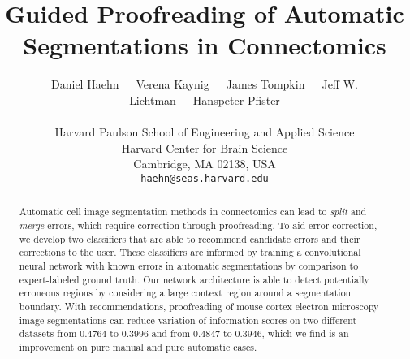 \documentclass[10pt,twocolumn,letterpaper]{article}
\newcommand\Mark[1]{\textsuperscript#1}
\begin{document}
\title{Guided Proofreading of Automatic Segmentations in Connectomics}
%

\author{Daniel Haehn~~~Verena Kaynig~~~James Tompkin~~~Jeff W. Lichtman~~~Hanspeter Pfister\\~\\
Harvard Paulson School of Engineering and Applied Science\\
Harvard Center for Brain Science\\
Cambridge, MA 02138, USA\\
{\tt\small haehn@seas.harvard.edu}
}

\maketitle

\begin{abstract}
Automatic cell image segmentation methods in connectomics can lead to \emph{split} and \emph{merge} errors, which require correction through proofreading. To aid error correction, we develop two classifiers that are able to recommend candidate errors and their corrections to the user. These classifiers are informed by training a convolutional neural network with known errors in automatic segmentations by comparison to expert-labeled ground truth. Our network architecture is able to detect potentially erroneous regions by considering a large context region around a segmentation boundary. With recommendations, proofreading of mouse cortex electron microscopy image segmentations can reduce variation of information scores on two different datasets from 0.4764 to 0.3996 and from 0.4847 to 0.3946, which we find is an improvement on pure manual and pure automatic cases.
\end{abstract}







{\small


}
\end{document}
